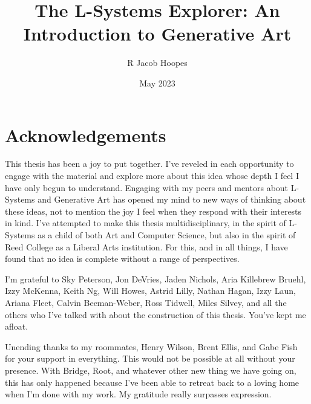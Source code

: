 \documentclass[12pt,twoside]{reedthesis}
\title{The L-Systems Explorer: An Introduction to Generative Art} %
\author{R Jacob Hoopes}
\date{May 2023}
\begin{document}
  \maketitle
  \frontmatter %
  \pagestyle{empty} %

    \chapter*{Acknowledgements}
	This thesis has been a joy to put together. I've reveled in each opportunity to engage with the material and explore more about this idea whose depth I feel I have only begun to understand. Engaging with my peers and mentors about L-Systems and Generative Art has opened my mind to new ways of thinking about these ideas, not to mention the joy I feel when they respond with their interests in kind. I've attempted to make this thesis multidisciplinary, in the spirit of L-Systems as a child of both Art and Computer Science, but also in the spirit of Reed College as a Liberal Arts institution. For this, and in all things, I have found that no idea is complete without a range of perspectives.
	
	I'm grateful to Sky Peterson, Jon DeVries, Jaden Nichols, Aria Killebrew Bruehl, Izzy McKenna, Keith Ng, Will Howes, Astrid Lilly, Nathan Hagan, Izzy Laun, Ariana Fleet, Calvin Beeman-Weber, Ross Tidwell, Miles Silvey, and all the others who I've talked with about the construction of this thesis. You've kept me afloat.
	
	Unending thanks to my roommates, Henry Wilson, Brent Ellis, and Gabe Fish for your support in everything. This would not be possible at all without your presence. With Bridge, Root, and whatever other new thing we have going on, this has only happened because I've been able to retreat back to a loving home when I'm done with my work. My gratitude really surpasses expression.
	
	
	
	
\end{document}
